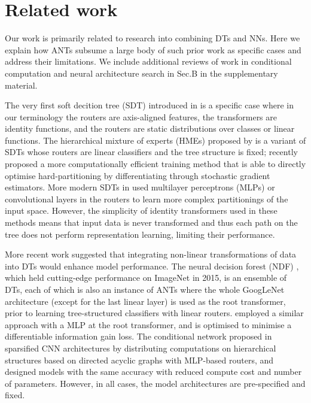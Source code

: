 \section{Related work}\label{sec:relatedwork}
Our work is primarily related to research into combining DTs and NNs. Here we explain how ANTs subsume a large body of such prior work as specific cases and address their limitations. We include additional reviews of work in conditional computation and neural architecture search in Sec.B in the supplementary material.

The very first soft decition tree (SDT) introduced in \cite{suarez1999globally} is a specific case where in our terminology the routers are axis-aligned features, the transformers are identity functions, and the routers are static distributions over classes or linear functions. The hierarchical mixture of experts (HMEs) proposed by \cite{jordan1994hierarchical} is a variant of SDTs whose routers are linear classifiers and the tree structure is fixed; \cite{leon2015policy} recently proposed a more computationally efficient training method that is able to directly optimise hard-partitioning by differentiating through stochastic gradient estimators. More modern SDTs in \cite{rota2014neural,laptev2014convolutional,frosst2017distilling} used multilayer perceptrons (MLPs) or convolutional layers in the routers to learn more complex partitionings of the input space. However, the simplicity of identity transformers used in these methods means that input data is never transformed and thus each path on the tree does not perform representation learning, limiting their performance.

More recent work suggested that integrating non-linear transformations of data into DTs would enhance model performance. The neural decision forest (NDF) \cite{kontschieder2015deep}, which held cutting-edge performance on ImageNet \cite{deng2009imagenet} in 2015, is an ensemble of DTs, each of which is also an instance of ANTs where the whole GoogLeNet architecture \cite{szegedy2015going} (except for the last linear layer) is used as the root transformer, prior to learning tree-structured classifiers with linear routers. \cite{xiao2017ndt} employed a similar approach with a MLP at the root transformer, and is optimised to minimise a differentiable information gain loss. The conditional network proposed in \cite{ioannou2016decision} sparsified CNN architectures by distributing computations on hierarchical structures based on directed acyclic graphs with MLP-based routers, and designed models with the same accuracy with reduced compute cost and number of parameters. However, in all cases, the model architectures are pre-specified and fixed.

